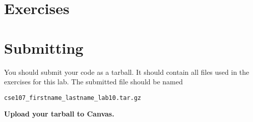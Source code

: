 \documentclass[11pt]{cselabheader}
\begin{document}
\clearpage
\section{Exercises}
\label{sec:ex}



\pagebreak
\section{Submitting}
You should submit your code as a tarball. It should contain all files
used in the exercises for this lab. The submitted file should be named
\begin{center}
  \texttt{cse107\_firstname\_lastname\_lab10.tar.gz}
\end{center}

\begin{center}
  \textbf{Upload your tarball to Canvas.}
\end{center}

\listoftheorems
\end{document}
